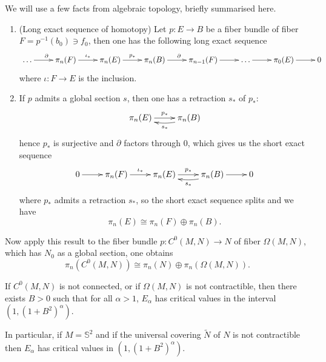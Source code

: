 We will use a few facts from algebraic topology, briefly summarised here.

\begin{fact}
\label{fact:alg-top-Omega-M-N}
\begin{enumerate}
\item (Long exact sequence of homotopy) Let \(p: E \longrightarrow B\) be a fiber bundle
of fiber \(F = p^{-1}(b_0) \ni f_0\), then one has the following long exact sequence
\[
    \xymatrix{
    \dots \ar@{->}[r]^{\partial} & \pi_n(F) \ar@{->}[r]^{\iota_*} & \pi_n(E) \ar@{->}[r]^{p_*} & \pi_n(B) \ar@{->}[r]^{\partial} & \pi_{n-1}(F) \ar@{->}[r] & \dots \ar@{->}[r] & \pi_0(E) \ar@{->}[r] & 0
    }
   \]
 where \(\iota: F \longrightarrow E\) is the inclusion.
\item If \(p\) admits a global section \(s\), then one has a retraction \(s_*\) of \(p_*\):
\[
    \xymatrix{
    \pi_n(E) \ar@{->}[r]^{p_*} & \pi_n(B) \ar@/^/@{->}[l]^{s_*}
    }
   \]
hence \(p_*\) is surjective and \(\partial\) factors through \(0\), which gives
us the short exact sequence
\[
    \xymatrix{
    0 \ar@{->}[r] & \pi_n(F) \ar@{->}[r]^{\iota_*} & \pi_n(E) \ar@{->}[r]^{p_*} & \pi_n(B) \ar@/^/@{->}[l]^{s_*} \ar@{->}[r] & 0
    }
   \]
where \(p_*\) admits a retraction \(s_*\), so the short exact sequence splits and
we have
\[
   \pi_n(E) \cong \pi_n(F) \oplus \pi_n(B).
   \]
\end{enumerate}
\end{fact}

Now apply this result to the fiber bundle \(p: C^0(M,N)
\longrightarrow N\) of fiber \(\Omega(M,N)\), which has \(N_0\) as a global section,
one obtains
\[
 \pi_n(C^0(M,N)) \cong \pi_n(N) \oplus \pi_n(\Omega(M,N)).
\]


\begin{theorem}
\label{thm:3-nontrivial-crit}
If \(C^0(M,N)\) is not connected, or if \(\Omega(M,N)\) is not contractible, then
there exists \(B>0\) such that for all \(\alpha >1\), \(E_\alpha\) has critical
values in the interval \((1, (1+B^2)^\alpha)\). 

In particular, if \(M=\mathbb{S}^2\) and if the universal covering \(\tilde N\) of \(N\) is not contractible then \(E_\alpha\) has critical values in \((1, (1+B^2)^\alpha)\).
\end{theorem}


